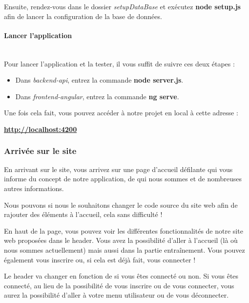 \documentclass[12pt,french]{article}
\begin{document}
\bigskip

Ensuite, rendez-vous dans le dossier \textit{setupDataBase} et exécutez \textbf{node setup.js} afin de lancer la configuration de la base de données.

\paragraph{Lancer l'application \\\\}

Pour lancer l'application et la tester, il vous suffit de suivre ces deux étapes :

\begin{itemize}
	\item Dans \textit{backend-api}, entrez la commande \textbf{node server.js}.
	\item Dans \textit{frontend-angular}, entrez la commande \textbf{ng serve}.
\end{itemize}

Une fois cela fait, vous pouvez accéder à notre projet en local à cette adresse :

\textbf{\href{http://localhost:4200}{http://localhost:4200}}

\subsubsection{Arrivée sur le site}

En arrivant sur le site, vous arrivez sur une page d'accueil défilante qui vous informe du concept de notre application, de qui nous sommes et de nombreuses autres informations.

Nous pouvons si nous le souhaitons changer le code source du site web afin de rajouter des éléments à l'accueil, cela sans difficulté !

\bigskip

En haut de la page, vous pouvez voir les différentes fonctionnalités de notre site web proposées dans le header. Vous avez la possibilité d'aller à l'accueil (là où nous sommes actuellement) mais aussi dans la partie entraînement. Vous pouvez également vous inscrire ou, si cela est déjà fait, vous connecter !

Le header va changer en fonction de si vous êtes connecté ou non. Si vous êtes connecté, au lieu de la possibilité de vous inscrire ou de vous connecter, vous aurez la possibilité d'aller à votre menu utilisateur ou de vous déconnecter.
\end{document}

